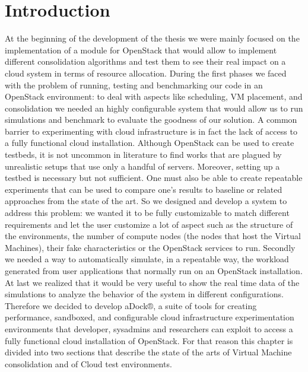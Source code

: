 




\section{Introduction}
\label{sec:sota_intro}
At the beginning of the development of the thesis we were mainly focused on the implementation of a module for OpenStack that would allow to implement different consolidation algorithms and test them to see their real impact on a cloud system in terms of resource allocation. During the first phases we faced with the problem of running, testing and benchmarking our code in an OpenStack environment: to deal with aspects like scheduling, VM placement, and consolidation we needed an highly configurable system that would allow us to run simulations and benchmark to evaluate the goodness of our solution. 
A common barrier to experimenting with cloud infrastructure is in fact the lack of access to a fully functional cloud installation. Although OpenStack can be used to create testbeds, it is not uncommon in literature to find works that are plagued by unrealistic setups that use only a handful of servers. Moreover, setting up a testbed is necessary but not sufficient. One must also be able to create repeatable experiments that can be used to compare one’s results to baseline or related approaches from the state of the art.
So we designed and develop a system to address this problem: we wanted it to be fully customizable to match different requirements and let the user customize a lot of aspect such as the structure of the environments, the number of compute nodes (the nodes that host the Virtual Machines), their fake characteristics or the OpenStack services to run. Secondly we needed a way to automatically simulate, in a repeatable way, the workload generated from user applications that normally run on an OpenStack installation. At last we realized that it would be very useful to show the real time data of the simulations to analyze the behavior of the system in different configurations.
Therefore we decided to develop aDock®, a suite of tools for creating performance, sandboxed, and configurable cloud infrastructure experimentation environments that developer, sysadmins and researchers can exploit to access a fully functional cloud installation of OpenStack.
For that reason this chapter is divided into two sections that describe the state of the arts of Virtual Machine consolidation and of Cloud test environments.


